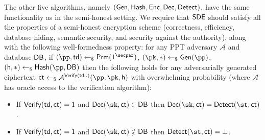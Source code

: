 The other five algorithms, namely $(\mathsf{Gen}, \mathsf{Hash}, \mathsf{Enc}, \mathsf{Dec}, {\mathsf{Detect}})$, have the same functionality as in the semi-honest setting. We require that ${\mathsf{SDE}}$ should satisfy all the properties of a semi-honest encryption scheme (correctness, efficiency, database hiding, semantic security, and security against the authority), along with the following well-formedness property:  for any PPT adversary $\mathcal{A}$ and database ${\mathsf{DB}}$, if $(\pp, \td) \pick \Glo(1^\secpar)$, $(\pk, *) \pick \Gen(\pp)$, $(\hsh, *) \pick \Hash(\pp, \DB)$ then the following holds for any adversarially generated ciphertext $\ct \pick \mathcal{A}^{\Verify(\td, .)}(\pp, \pk, \hsh)$ with overwhelming probability (where $\mathcal{A}$ has oracle access to the verification algorithm): 

\begin{itemize}
 	\item If $\mathsf{Verify}(\mathsf{td}, \mathsf{ct} ) = 1$ and $\Dec(\sk, \ct) \in \DB$ then $\Dec(\sk, \ct) = \Det(\st, \ct)$.
	
 	\item If $\mathsf{Verify}(\mathsf{td}, \mathsf{ct} ) = 1$ and $\Dec(\sk, \ct) \notin \DB$ then $\Det(\st, \ct) = \bot$.
 \end{itemize}

